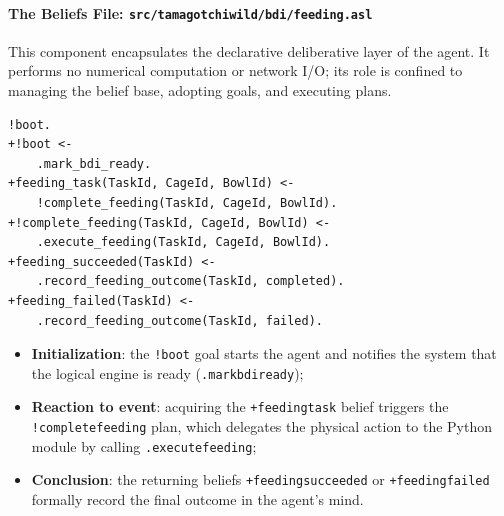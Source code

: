 \documentclass{article}
\renewcommand{\_}{\oldtextunderscore\allowbreak}
\begin{document}
\paragraph{The Beliefs File: \texttt{src/tamagotchi\_wild/bdi/feeding.asl}}
This component encapsulates the declarative deliberative layer of the agent. It performs no numerical computation or network I/O; its role is confined to managing the belief base, adopting goals, and executing plans.
\begin{lstlisting}
!boot.
+!boot <-
    .mark_bdi_ready.
+feeding_task(TaskId, CageId, BowlId) <-
    !complete_feeding(TaskId, CageId, BowlId).
+!complete_feeding(TaskId, CageId, BowlId) <-
    .execute_feeding(TaskId, CageId, BowlId).
+feeding_succeeded(TaskId) <-
    .record_feeding_outcome(TaskId, completed).
+feeding_failed(TaskId) <-
    .record_feeding_outcome(TaskId, failed).
\end{lstlisting}
\begin{itemize}
    \item \textbf{Initialization}: the \texttt{!boot} goal starts the agent and notifies the system that the logical engine is ready (\texttt{.mark\_bdi\_ready});
    \item \textbf{Reaction to event}: acquiring the \texttt{+feeding\_task} belief triggers the \texttt{!complete\_feeding} plan, which delegates the physical action to the Python module by calling \texttt{.execute\_feeding};
    \item \textbf{Conclusion}: the returning beliefs \texttt{+feeding\_succeeded} or \texttt{+feeding\_failed} formally record the final outcome in the agent's mind.
\end{itemize}
\end{document}

